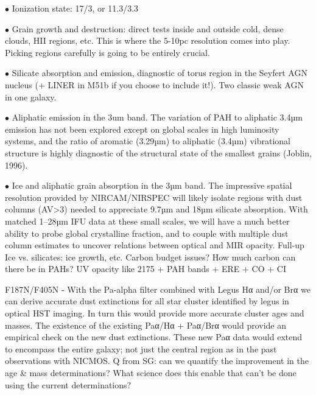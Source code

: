 \documentclass[12pt]{article}
\begin{document}
\noindent $\bullet$ Ionization state: 17/3, or 11.3/3.3

\noindent $\bullet$ Grain growth and destruction: direct tests inside and outside cold, dense clouds, HII regions, etc.  This is where the 5-10pc resolution comes into play.  Picking regions carefully is going to be entirely crucial.

\noindent $\bullet$ Silicate absorption and emission, diagnostic of torus region in the Seyfert AGN nucleus (+ LINER in M51b if you choose to include it!).  Two classic weak AGN in one galaxy.

\noindent $\bullet$ Aliphatic emission in the 3um band.  The variation of PAH to aliphatic 3.4µm emission has not been explored except on global scales in high luminosity systems, and the ratio of aromatic (3.29µm) to aliphatic (3.4µm) vibrational structure is highly diagnostic of the structural state of the smallest grains (Joblin, 1996).

\noindent $\bullet$ Ice and aliphatic grain absorption in the 3µm band.  The impressive spatial resolution provided by NIRCAM/NIRSPEC will likely isolate regions with dust columns (AV>3) needed to appreciate 9.7µm and 18µm silicate absorption.  With matched 1–28µm IFU data at these small scales, we will have a much better ability to probe global crystalline fraction, and to couple with multiple dust column estimates to uncover relations between optical and MIR opacity.  Full-up Ice vs. silicates: ice growth, etc. 
Carbon budget issues?  How much carbon can there be in PAHs?  UV opacity like 2175 + PAH bands + ERE + CO + CI

\vspace{0.1in}


F187N/F405N - With the Pa-alpha filter combined with Legus Hα and/or Brα we can derive accurate dust extinctions for all star cluster identified by legus in optical HST imaging. In turn this would provide more accurate cluster ages and masses. The existence of the existing Paα/Ηα + Paα/Brα would provide an empirical check on the new dust extinctions. These new Paα data would extend to encompass the entire galaxy; not just the central region as in the past observations with NICMOS.
Q from SG: can we quantify the improvement in the age & mass determinations? What science does this enable that can’t be done using the current determinations?
\end{document}
